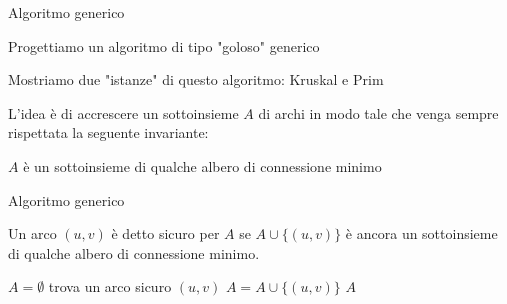 \begin{frame}{Algoritmo generico}

\vspace{-9pt}
\begin{myboxtitle}
\BI
\item Progettiamo un algoritmo di tipo "goloso" generico
\item Mostriamo due "istanze" di questo algoritmo: \alert{Kruskal} e \alert{Prim}
\EI
\end{myboxtitle}

\begin{myboxtitle}[Approccio]
L'idea è di accrescere un sottoinsieme $A$ di archi in modo tale che venga sempre
rispettata la seguente invariante:
\BI
\item $A$ è un sottoinsieme di qualche albero di connessione minimo
\EI
\end{myboxtitle}

\end{frame}

\begin{frame}{Algoritmo generico}

\vspace{-9pt}
\begin{myboxtitle}
Un arco $(u,v)$ è detto \alert{sicuro per $A$} se $A \cup \{(u,v)\}$ è ancora un sottoinsieme di qualche albero di connessione minimo.
\end{myboxtitle}

\medskip
\begin{Procedure}
\caption[A]{\Set\ (\Graph $G$, $\INTEGER[\,]\ w$)}

  \Set $A = \emptyset$\;
  {
     trova un arco sicuro $(u,v)$\;
     $A = A \cup \{(u,v)\}$\;
  } 
  \Return $A$\;  

\end{Procedure}

\end{frame}


